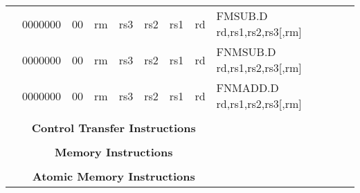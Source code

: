 \begin{table}[p]
\begin{small}
\begin{center}
\begin{tabular}{rcccccccccl}
&
\multicolumn{1}{|c|}{0000000} &
\multicolumn{1}{c|}{00} &
\multicolumn{2}{c|}{rm} &
\multicolumn{2}{c|}{rs3} &
\multicolumn{1}{c|}{rs2} &
\multicolumn{1}{c|}{rs1} &
\multicolumn{1}{c|}{rd} & FMSUB.D rd,rs1,rs2,rs3[,rm] \\
\cline{2-10}
  

&
\multicolumn{1}{|c|}{0000000} &
\multicolumn{1}{c|}{00} &
\multicolumn{2}{c|}{rm} &
\multicolumn{2}{c|}{rs3} &
\multicolumn{1}{c|}{rs2} &
\multicolumn{1}{c|}{rs1} &
\multicolumn{1}{c|}{rd} & FNMSUB.D rd,rs1,rs2,rs3[,rm] \\
\cline{2-10}
  

&
\multicolumn{1}{|c|}{0000000} &
\multicolumn{1}{c|}{00} &
\multicolumn{2}{c|}{rm} &
\multicolumn{2}{c|}{rs3} &
\multicolumn{1}{c|}{rs2} &
\multicolumn{1}{c|}{rs1} &
\multicolumn{1}{c|}{rd} & FNMADD.D rd,rs1,rs2,rs3[,rm] \\
\cline{2-10}
  

&
\multicolumn{9}{c}{} & \\
&
\multicolumn{9}{c}{\bf Control Transfer Instructions} & \\
\cline{2-10}
  

&
\multicolumn{9}{c}{} & \\
&
\multicolumn{9}{c}{\bf Memory Instructions} & \\
\cline{2-10}
  

&
\multicolumn{9}{c}{} & \\
&
\multicolumn{9}{c}{\bf Atomic Memory Instructions} & \\
\cline{2-10}
  

\end{tabular}
\end{center}
\end{small}

\label{instr-table}
\end{table}
  

\newpage

